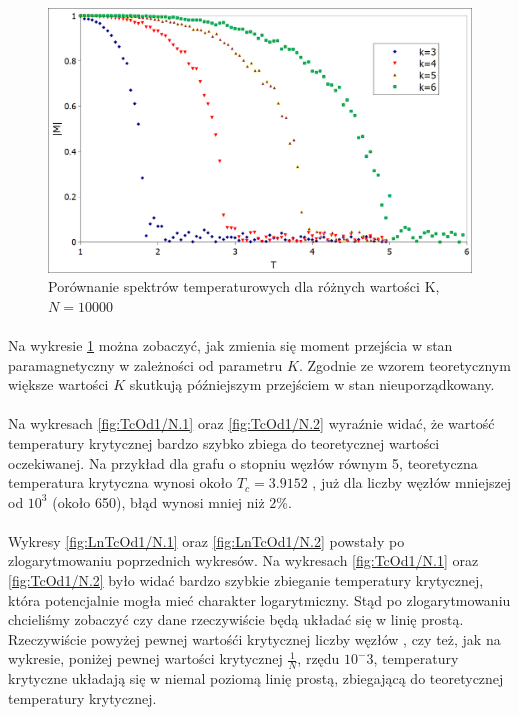 \documentclass[12pt,a4paper]{article}
\begin{document}
\begin{figure}[H]
\includegraphics[width=\textwidth]{rozne_K.png}
\caption{Porównanie spektrów temperaturowych dla różnych wartości K, $N=10000$}
\label{fig:rozne_K}
\end{figure}

\paragraph{}
Na wykresie \ref{fig:rozne_K} można zobaczyć, jak zmienia się moment przejścia w stan paramagnetyczny w zależności od parametru $K$. Zgodnie ze wzorem teoretycznym większe wartości $K$ skutkują późniejszym przejściem w stan nieuporządkowany.

\paragraph{}
Na wykresach \ref{fig:TcOd1/N.1} oraz \ref{fig:TcOd1/N.2} wyraźnie widać, że wartość temperatury krytycznej bardzo szybko zbiega do teoretycznej wartości oczekiwanej. Na przykład dla grafu o stopniu węzłów równym 5, teoretyczna temperatura krytyczna wynosi około $T_{c} = 3.9152$ , już dla liczby węzłów mniejszej od $10^3$ (około 650), błąd wynosi mniej niż $2\%$.

\paragraph{}
Wykresy \ref{fig:LnTcOd1/N.1} oraz \ref{fig:LnTcOd1/N.2} powstały po zlogarytmowaniu poprzednich wykresów. Na wykresach \ref{fig:TcOd1/N.1} oraz \ref{fig:TcOd1/N.2} było widać bardzo szybkie zbieganie temperatury krytycznej, która potencjalnie mogła mieć charakter logarytmiczny. Stąd po zlogarytmowaniu chcieliśmy zobaczyć czy dane rzeczywiście będą układać się w linię prostą. Rzeczywiście powyżej pewnej wartośći krytycznej liczby węzłów , czy też, jak na wykresie, poniżej pewnej wartości krytycznej $\frac{1}{N}$, rzędu $10^-3$, temperatury krytyczne układają się w niemal poziomą linię prostą, zbiegającą do teoretycznej temperatury krytycznej.
\end{document}
